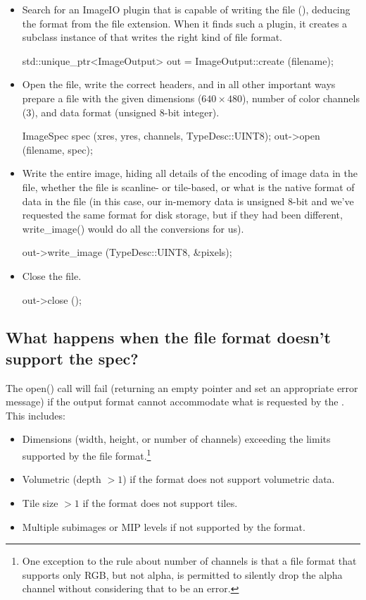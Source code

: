 \begin{itemize}
\item Search for an ImageIO plugin that is capable of writing the file
  (), deducing the format from the file extension.  When it
  finds such a plugin, it creates a subclass instance of \ImageOutput
  that writes the right kind of file format.
  \begin{code}
        std::unique_ptr<ImageOutput> out = ImageOutput::create (filename);
  \end{code}
\item Open the file, write the correct headers, and in all other
  important ways prepare a file with the given dimensions ($640 \times
  480$), number of color channels (3), and data format (unsigned 8-bit
  integer).
  \begin{code}
        ImageSpec spec (xres, yres, channels, TypeDesc::UINT8);
        out->open (filename, spec);
  \end{code}
\item Write the entire image, hiding all details of the encoding of
  image data in the file, whether the file is scanline- or tile-based,
  or what is the native format of data in the file (in this case, our
  in-memory data is unsigned 8-bit and we've requested the same format
  for disk storage, but if they had been different, {\kw write_image()}
  would do all the conversions for us).
  \begin{code}
        out->write_image (TypeDesc::UINT8, &pixels);
  \end{code}
\item Close the file.
  \begin{code}
        out->close ();
  \end{code}
\end{itemize}

\subsection*{What happens when the file format doesn't support the spec?}

The {\cf open()} call will fail (returning an empty pointer and set an appropriate
error message) if the output format cannot accommodate what is requested by
the \ImageSpec. This includes:
\begin{itemize}
\item Dimensions (width, height, or number of channels) exceeding the limits
  supported by the file format.\footnote{One exception to the rule about
  number of channels is that a file format that supports only RGB, but not
  alpha, is permitted to silently drop the alpha channel without considering
  that to be an error.}
\item Volumetric (depth $> 1$) if the format does not support volumetric
  data.
\item Tile size $>1$ if the format does not support tiles.
\item Multiple subimages or MIP levels if not supported by the format.
\end{itemize}


